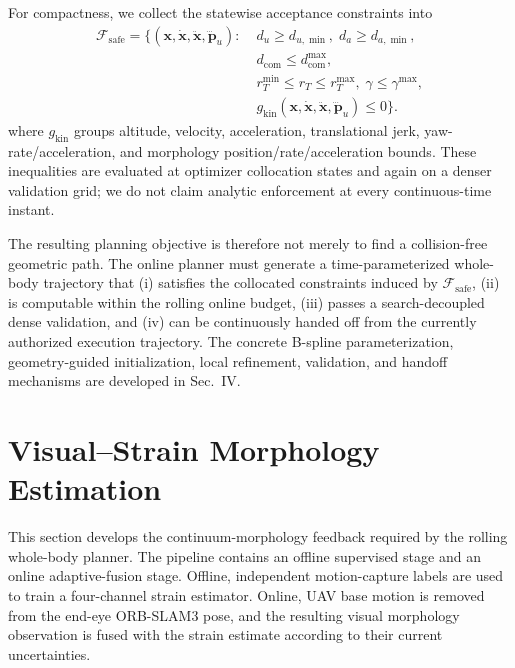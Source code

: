 \documentclass[journal,twoside]{IEEEtran}
\begin{document}
For compactness, we collect the statewise acceptance constraints into
\begin{equation}
\begin{aligned}
\mathcal F_{\mathrm{safe}}=\{(\mathbf x,\dot{\mathbf x},\ddot{\mathbf x},\dddot{\mathbf p}_u):\;&
 d_u\ge d_{u,\min},\; d_a\ge d_{a,\min},\\
& d_{\mathrm{com}}\le d_{\mathrm{com}}^{\max},\\
& r_T^{\min}\le r_T\le r_T^{\max},\;
 \gamma\le\gamma^{\max},\\
& g_{\mathrm{kin}}(\mathbf x,\dot{\mathbf x},\ddot{\mathbf x},\dddot{\mathbf p}_u)\le0\}.
\end{aligned}
\label{eq:safe_set}
\end{equation}
where $g_{\mathrm{kin}}$ groups altitude, velocity, acceleration, translational jerk, yaw-rate/acceleration, and morphology position/rate/acceleration bounds. These inequalities are evaluated at optimizer collocation states and again on a denser validation grid; we do not claim analytic enforcement at every continuous-time instant.

The resulting planning objective is therefore not merely to find a collision-free geometric path. The online planner must generate a time-parameterized whole-body trajectory that (i) satisfies the collocated constraints induced by $\mathcal F_{\mathrm{safe}}$, (ii) is computable within the rolling online budget, (iii) passes a search-decoupled dense validation, and (iv) can be continuously handed off from the currently authorized execution trajectory. The concrete B-spline parameterization, geometry-guided initialization, local refinement, validation, and handoff mechanisms are developed in Sec.~IV.


\section{Visual--Strain Morphology Estimation}
This section develops the continuum-morphology feedback required by the rolling whole-body planner. The pipeline contains an offline supervised stage and an online adaptive-fusion stage. Offline, independent motion-capture labels are used to train a four-channel strain estimator. Online, UAV base motion is removed from the end-eye ORB-SLAM3 pose, and the resulting visual morphology observation is fused with the strain estimate according to their current uncertainties.
\end{document}
